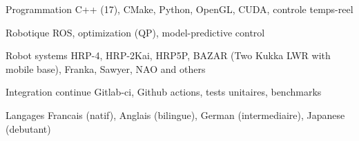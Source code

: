 

\begin{cvskills}

  \cvskill
    {Programmation} %
    {C++ (17), CMake, Python, OpenGL, CUDA, controle temps-reel} %

  \cvskill
    {Robotique} %
    {ROS, optimization (QP), model-predictive control} %

  \cvskill
    {Robot systems} %
    {HRP-4, HRP-2Kai, HRP5P, BAZAR (Two Kukka LWR with mobile base), Franka, Sawyer, NAO and others} %

  \cvskill
    {Integration continue} %
    {Gitlab-ci, Github actions, tests unitaires, benchmarks} %


  \cvskill
    {Langages} %
    {Francais (natif), Anglais (bilingue), German (intermediaire), Japanese (debutant)} %

\end{cvskills}
